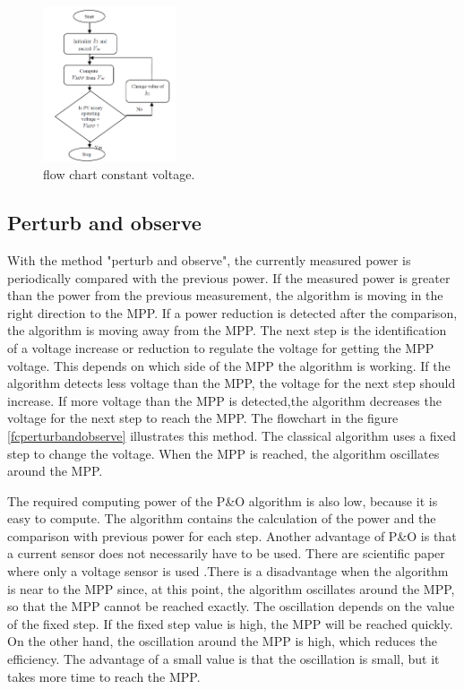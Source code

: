 \begin{figure}[H]
	\begin{center}
		\includegraphics[width=0.35\textwidth]{../Pictures/P1/Flow_chart/Flow_chart_constant_voltage}
		\caption{flow chart constant voltage\cite{flowchartVC}. }
		\label{fcconstantvoltage}
	\end{center}	
\end{figure}

\subsection{Perturb and observe}
With the method "perturb and observe", the currently measured power is periodically compared with the previous power. If the measured power is greater than the power from the previous measurement, the algorithm is moving in the right direction to the MPP. If a power reduction is detected after the comparison, the algorithm is moving away from the MPP. The next step is the identification of a voltage increase or reduction to regulate the voltage for getting the MPP voltage. This depends on which side of the MPP the algorithm is working. If the algorithm detects less voltage than the MPP, the voltage for the next step should increase. If more voltage than the MPP is detected,the algorithm decreases the voltage for the next step to reach the MPP.
The flowchart in the figure \ref{fcperturbandobserve} illustrates this method. The classical algorithm uses a fixed step to change the voltage. When the MPP is reached, the algorithm oscillates around the MPP\cite{flowchartVC}. 

The required computing power of the P\&O algorithm is also low, because it is easy to compute. The algorithm contains the calculation of the power and the comparison with previous power for each step. Another advantage of P\&O is that a current sensor does not necessarily have to be used. There are scientific paper where only a voltage sensor is used \cite{withoutcurrent}.There is a disadvantage when the algorithm is near to the MPP since, at this point, the algorithm oscillates around the MPP, so that the MPP cannot be reached exactly. The oscillation depends on the value of the fixed step. If the fixed step value is high, the MPP will be reached quickly. On the other hand, the oscillation around the MPP is high, which reduces the efficiency. The advantage of a small value is that the oscillation is small, but it takes more time to reach the MPP\cite{AN1521_MC}. 

